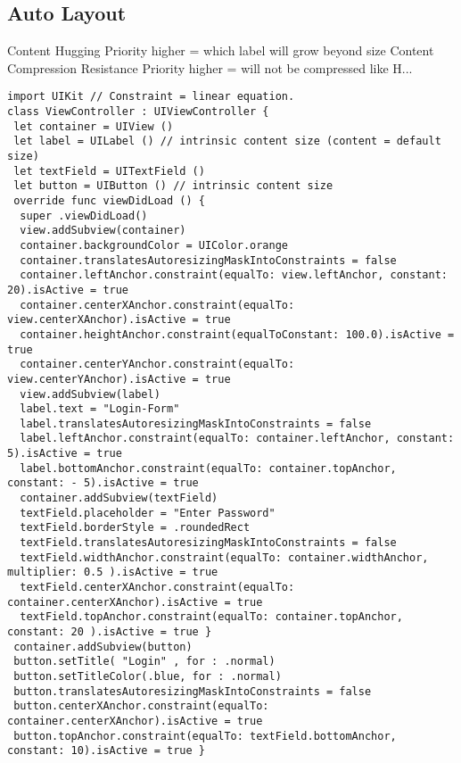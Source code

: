 \subsection{Auto Layout}
Content Hugging Priority higher = which label will grow beyond size
Content Compression Resistance Priority higher = will not be compressed like H... 
\begin{lstlisting}
import UIKit // Constraint = linear equation.
class ViewController : UIViewController {
 let container = UIView ()
 let label = UILabel () // intrinsic content size (content = default size)
 let textField = UITextField ()
 let button = UIButton () // intrinsic content size
 override func viewDidLoad () {
  super .viewDidLoad()
  view.addSubview(container)
  container.backgroundColor = UIColor.orange
  container.translatesAutoresizingMaskIntoConstraints = false
  container.leftAnchor.constraint(equalTo: view.leftAnchor, constant: 20).isActive = true
  container.centerXAnchor.constraint(equalTo: view.centerXAnchor).isActive = true
  container.heightAnchor.constraint(equalToConstant: 100.0).isActive = true
  container.centerYAnchor.constraint(equalTo: view.centerYAnchor).isActive = true
  view.addSubview(label)
  label.text = "Login-Form"
  label.translatesAutoresizingMaskIntoConstraints = false
  label.leftAnchor.constraint(equalTo: container.leftAnchor, constant: 5).isActive = true
  label.bottomAnchor.constraint(equalTo: container.topAnchor, constant: - 5).isActive = true
  container.addSubview(textField)
  textField.placeholder = "Enter Password"
  textField.borderStyle = .roundedRect
  textField.translatesAutoresizingMaskIntoConstraints = false
  textField.widthAnchor.constraint(equalTo: container.widthAnchor, multiplier: 0.5 ).isActive = true
  textField.centerXAnchor.constraint(equalTo: container.centerXAnchor).isActive = true
  textField.topAnchor.constraint(equalTo: container.topAnchor, constant: 20 ).isActive = true }
 container.addSubview(button)
 button.setTitle( "Login" , for : .normal)
 button.setTitleColor(.blue, for : .normal)
 button.translatesAutoresizingMaskIntoConstraints = false
 button.centerXAnchor.constraint(equalTo: container.centerXAnchor).isActive = true
 button.topAnchor.constraint(equalTo: textField.bottomAnchor, constant: 10).isActive = true }
\end{lstlisting}


